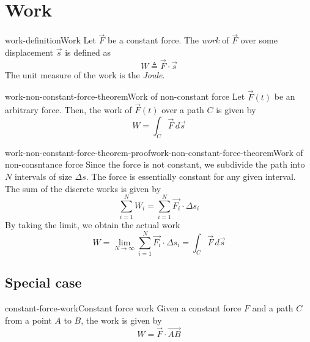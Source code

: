 \documentclass[preview]{standalone}
\begin{document}
\genpage

\section{Work}

\begin{snippetdefinition}{work-definition}{Work}
    Let \(\vec{F}\) be a constant force. The \emph{work}
    of \(\vec{F}\) over some displacement \(\vec{s}\) is defined as
    \[
        W \triangleq \vec{F} \cdot \vec{s}
    \]
    The unit measure of the work is the \emph{Joule}.
\end{snippetdefinition}


\begin{snippettheorem}{work-non-constant-force-theorem}{Work of non-constant force}
    Let \(\vec{F}(t)\) be an arbitrary force. Then, the work
    of \(\vec{F}(t)\) over a path \(C\) is given by
    \[
        W = \int_C \vec{F}\,d\vec{s}
    \]
\end{snippettheorem}

\begin{snippetproof}{work-non-constant-force-theorem-proof}{work-non-constant-force-theorem}{Work of non-consntance force}
    Since the force is not constant, we subdivide the path into \(N\) intervals of size \(\Delta s\).
    The force is essentially constant for any given interval. The sum of the discrete works is given by
    \[
        \sum_{i=1}^N W_i = \sum_{i=1}^N \vec{F_i} \cdot \Delta s_i
    \]
    By taking the limit, we obtain the actual work
    \[
        W = \lim_{N \to \infty} \sum_{i=1}^N \vec{F_i} \cdot \Delta s_i
        = \int_C \vec{F}\,d\vec{s}
    \]
\end{snippetproof}


\subsection{Special case}

\begin{snippetproposition}{constant-force-work}{Constant force work}
    Given a constant force \(F\) and a path \(C\) from a point \(A\) to \(B\), the work is given by
    \[
        W = \vec{F} \cdot \vec{AB}
    \]
\end{snippetproposition}
\end{document}
